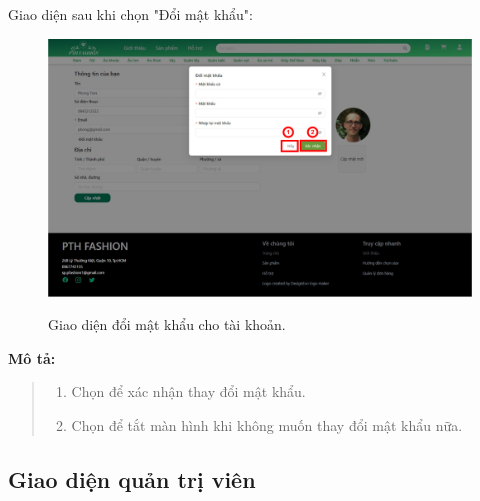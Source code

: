     \newpage
 
    Giao diện sau khi chọn "Đổi mật khẩu":
    \begin{figure}[!htp]
        \centering
        \includegraphics[width=5in]{img/UI/new_customer/change_password.png}
        \label{16}
        \newline
        \caption{Giao diện đổi mật khẩu cho tài khoản.}
    \end{figure}
 
    \textbf{Mô tả:}  
    \begin{quote}
        \begin{enumerate}
            \item Chọn để xác nhận thay đổi mật khẩu.
            \item Chọn để tắt màn hình khi không muốn thay đổi mật khẩu nữa.
        \end{enumerate}
    \end{quote}  
   
\newpage


\subsection{Giao diện quản trị viên}
